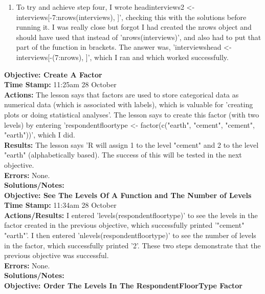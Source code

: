 \documentclass{article}
\begin{document}
\begin{FlushLeft}
\begin{enumerate}
    \item To try and achieve step four, I wrote head\textunderscore interviews2 \textless - interviews[-7:nrows(interviews), ]', checking this with the solutions before running it. I was really close but forgot I had created the n\textunderscore rows object and should have used that instead of 'nrows(interviews)', and also had to put that part of the function in brackets. The answer was, 'interviews\textunderscore head \textless - interviews[-(7:n\textunderscore rows), ]', which I ran and which worked successfully.
\end{enumerate}
\vspace{5mm}
\textbf{Objective: Create A Factor}\\ 
\textbf{Time Stamp:} 11:25am 28 October\\
\textbf{Actions:} The lesson says that factors are used to store categorical data as numerical data (which is associated with labels), which is valuable for 'creating plots or doing statistical analyses'. The lesson says to create this factor (with two levels) by entering 'respondent\textunderscore floor\textunderscore type \textless - factor(c("earth", "cement", "cement", "earth"))', which I did.\\
\textbf{Results:} The lesson says 'R will assign 1 to the level "cement" and 2 to the level "earth" (alphabetically based). The success of this will be tested in the next objective.\\
\textbf{Errors:} None.\\
\textbf{Solutions/Notes:}\\
\vspace{5mm}
\textbf{Objective: See The Levels Of A Function and The Number of Levels}\\ 
\textbf{Time Stamp:} 11:34am 28 October\\
\textbf{Actions/Results:} I entered 'levels(respondent\textunderscore floor\textunderscore type)' to see the levels in the factor created in the previous objective, which successfully printed '"cement" "earth"'. I then entered 'nlevels(respondent\textunderscore floor\textunderscore type)' to see the number of levels in the factor, which successfully printed '2'. These two steps demonstrate that the previous objective was successful.\\
\textbf{Errors:} None.\\
\textbf{Solutions/Notes:}\\
\vspace{5mm}
\textbf{Objective: Order The Levels In The Respondent\textunderscore Floor\textunderscore Type Factor}\\ 

\end{FlushLeft}
\end{document}
